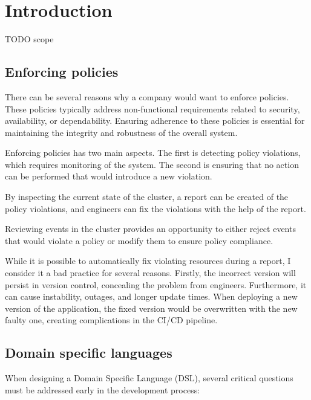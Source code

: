 \setlength{\parindent}{0pt}
\setlength{\parskip}{0.6em}

\chapter{Introduction}
\label{chap:intro}

TODO scope

\section{Enforcing policies}

There can be several reasons why a company would want to enforce policies. These policies typically address non-functional requirements related to security, availability, or dependability. Ensuring adherence to these policies is essential for maintaining the integrity and robustness of the overall system.

Enforcing policies has two main aspects. The first is detecting policy violations, which requires monitoring of the system. The second is ensuring that no action can be performed that would introduce a new violation.

By inspecting the current state of the cluster, a report can be created of the policy violations, and engineers can fix the violations with the help of the report.

Reviewing events in the cluster provides an opportunity to either reject events that would violate a policy or modify them to ensure policy compliance.

While it is possible to automatically fix violating resources during a report, I consider it a bad practice for several reasons. Firstly, the incorrect version will persist in version control, concealing the problem from engineers. Furthermore, it can cause instability, outages, and longer update times. When deploying a new version of the application, the fixed version would be overwritten with the new faulty one, creating complications in the CI/CD pipeline.

\section{Domain specific languages}

When designing a Domain Specific Language (DSL), several critical questions must be addressed early in the development process:

